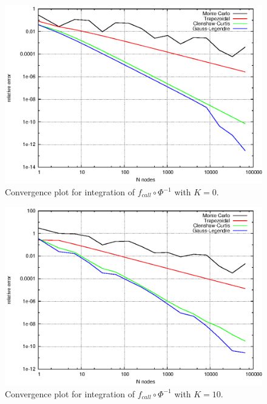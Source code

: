 \documentclass[]{article}
\begin{document}
\begin{figure}[!ht]
\centering
\includegraphics{task10Plot_0}
\caption{Convergence plot for integration of
$f_{call}\circ \Phi^{-1}$ with $K = 0$.}
\label{fig:Task10_0}
\end{figure}

\begin{figure}[!ht]
\centering
\includegraphics{task10Plot_10}
\caption{Convergence plot for integration of
$f_{call}\circ \Phi^{-1}$ with $K = 10$.}
\label{fig:Task10_10}
\end{figure}
\end{document}
